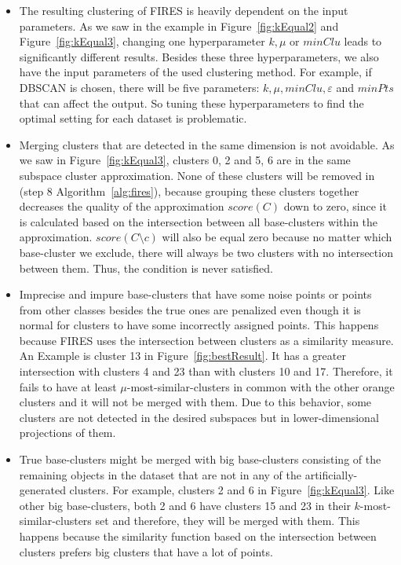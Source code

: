 \begin{itemize}
	\item The resulting clustering of FIRES is heavily dependent on the input parameters. As we saw in the example in Figure~\ref{fig:kEqual2} and Figure~\ref{fig:kEqual3}, changing one hyperparameter $k, \mu$ or $minClu$ leads to significantly different results. Besides these three hyperparameters, we also have the input parameters of the used clustering method. For example, if DBSCAN is chosen, there will be five parameters: $k, \mu, minClu, \varepsilon$ and $minPts$ that can affect the output. So tuning these hyperparameters to find the optimal setting for each dataset is problematic.
	\item Merging clusters that are detected in the same dimension is not avoidable. As we saw in Figure~\ref{fig:kEqual3}, clusters 0, 2 and 5, 6 are in the same subspace cluster approximation. None of these clusters will be removed in (step 8 Algorithm~\ref{alg:fires}), because grouping these clusters together decreases the quality of the approximation $score(C)$ down to zero, since it is calculated based on the intersection between all base-clusters within the approximation. $score(C\setminus c)$ will also be equal zero because no matter which base-cluster we exclude, there will always be two clusters with no intersection between them. Thus, the condition is never satisfied. 
	\item Imprecise and impure base-clusters that have some noise points or  points from other classes besides the true ones are penalized even though it is normal for clusters to have some incorrectly assigned points. This happens because FIRES uses the intersection between clusters as a similarity measure. An Example is cluster 13 in Figure~\ref{fig:bestResult}. It has a greater intersection with clusters 4 and 23 than with clusters 10 and 17. Therefore, it fails to have at least $\mu$-most-similar-clusters in common with the other orange clusters and it will not be merged with them. Due to this behavior, some clusters are not detected in the desired subspaces but in lower-dimensional projections of them.
	\item True base-clusters might be merged with big base-clusters consisting of the remaining objects in the dataset that are not in any of the artificially-generated clusters. For example, clusters 2 and 6 in Figure~\ref{fig:kEqual3}. Like other big base-clusters, both 2 and 6 have clusters 15 and 23 in their $k$-most-similar-clusters set and therefore, they will be merged with them. This happens because the similarity function based on the intersection between clusters prefers big clusters that have a lot of points.  

\end{itemize}
